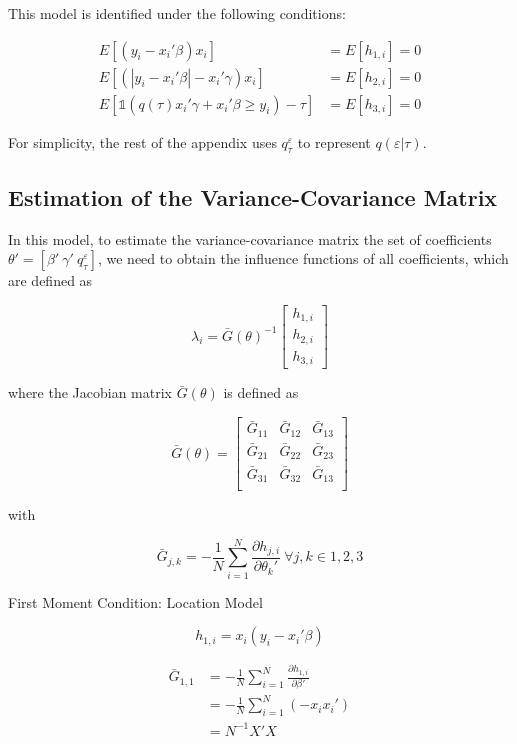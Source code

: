 \documentclass[
  authoryear,
  review,
  1p]{elsarticle}
\begin{document}
This model is identified under the following conditions:

\[\begin{aligned}
  E[(y_i-x_i'\beta)x_i ]  &= E[h_{1,i}]=0 \\
  E[ (|y_i-x_i'\beta|-x_i' \gamma) x_i ] &=E[h_{2,i}]=0 \\
  E\left[  \mathbb{1}\left( q(\tau) x_i'\gamma +x_i'\beta\geq  y_i  \right) - \tau \right] 
   &=E[h_{3,i}]=0 
\end{aligned}
\]

For simplicity, the rest of the appendix uses \(q^\varepsilon_\tau\) to
represent \(q(\varepsilon | \tau)\).

\hypertarget{estimation-of-the-variance-covariance-matrix}{%
\subsection{Estimation of the Variance-Covariance
Matrix}\label{estimation-of-the-variance-covariance-matrix}}

In this model, to estimate the variance-covariance matrix the set of
coefficients \(\theta'=[\beta' \ \gamma' \ q^\varepsilon_\tau]\), we
need to obtain the influence functions of all coefficients, which are
defined as

\[\lambda_i = \bar G(\theta)^{-1}
\begin{bmatrix}
h_{1,i} \\
h_{2,i} \\
h_{3,i}
\end{bmatrix}
\]

where the Jacobian matrix \(\bar G(\theta)\) is defined as

\[\bar G(\theta) = \begin{bmatrix}
\bar G_{11} & \bar G_{12} & \bar G_{13} \\
\bar G_{21} & \bar G_{22} & \bar G_{23} \\
\bar G_{31} & \bar G_{32} & \bar G_{13} \\
\end{bmatrix}
\]

with

\[\bar G_{j,k} = - \frac 1 N \sum_{i=1}^N \frac{\partial h_{j,i}}{\partial \theta_k'} \ \forall j,k \in 1,2,3
\]

First Moment Condition: Location Model

\[h_{1,i}=x_i(y_i-x_i'\beta)\]

\[\begin{aligned}
\bar G_{1,1} &=- \frac{1}{N} \sum_{i=1}^N \frac{\partial h_{1,i}}{\partial \beta'} \\
             &=- \frac{1}{N} \sum_{i=1}^N (-x_i x_i') \\
             &= N^{-1} X'X
\end{aligned}
\]
\end{document}
